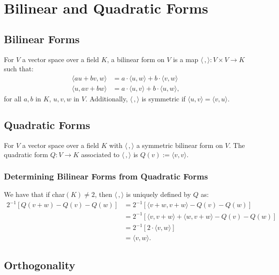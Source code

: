 \section{Bilinear and Quadratic Forms}

\subsection{Bilinear Forms}

For $V$ a vector space over a field $K$, a bilinear form on $V$ is a map $\langle\,,\rangle : V \times V \to K$
such that: \begin{align*}
  \langle au + bv, w \rangle &= a \cdot \langle u, w \rangle + b \cdot \langle v, w \rangle \\
  \langle u, av + bw \rangle &= a \cdot \langle u, v \rangle + b \cdot \langle u, w \rangle,
\end{align*} for all $a, b$ in $K$, $u, v, w$ in $V$. Additionally, $\langle\,,\rangle$ is symmetric if 
$\langle u, v \rangle = \langle v, u \rangle$.

\subsection{Quadratic Forms}

For $V$ a vector space over a field $K$ with $\langle \, , \rangle$ a symmetric bilinear form on
$V$. The quadratic form $Q : V \to K$ associated to $\langle \, , \rangle$ is 
$Q(v) := \langle v, v \rangle$.

\subsubsection{Determining Bilinear Forms from Quadratic Forms}

We have that if char$(K) \neq 2$, then $\langle \, , \rangle$ is uniquely defined by $Q$ as:
\begin{align*}
  2^{-1}[Q(v + w) - Q(v) - Q(w)] 
  &= 2^{-1}[\langle v + w, v + w \rangle - Q(v) - Q(w)] \\
  &= 2^{-1}[\langle v, v + w \rangle + \langle w, v + w \rangle - Q(v) - Q(w)] \\
  &= 2^{-1}[2 \cdot \langle v, w \rangle] 
  \tag{$\langle \, , \rangle$ is symmetric} \\
  &= \langle v, w \rangle.
\end{align*} 

\subsection{Orthogonality}

